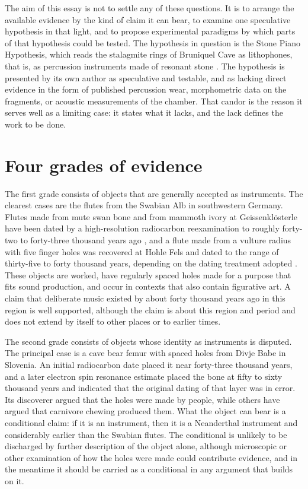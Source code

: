 \documentclass[12pt]{article}
\begin{document}
The aim of this essay is not to settle any of these questions. It is to arrange the available evidence by the kind of claim it can bear, to examine one speculative hypothesis in that light, and to propose experimental paradigms by which parts of that hypothesis could be tested. The hypothesis in question is the Stone Piano Hypothesis, which reads the stalagmite rings of Bruniquel Cave as lithophones, that is, as percussion instruments made of resonant stone \cite{stonepiano}. The hypothesis is presented by its own author as speculative and testable, and as lacking direct evidence in the form of published percussion wear, morphometric data on the fragments, or acoustic measurements of the chamber. That candor is the reason it serves well as a limiting case: it states what it lacks, and the lack defines the work to be done.

\section{Four grades of evidence}

The first grade consists of objects that are generally accepted as instruments. The clearest cases are the flutes from the Swabian Alb in southwestern Germany. Flutes made from mute swan bone and from mammoth ivory at Geissenkl\"osterle have been dated by a high-resolution radiocarbon reexamination to roughly forty-two to forty-three thousand years ago \cite{higham2012}, and a flute made from a vulture radius with five finger holes was recovered at Hohle Fels and dated to the range of thirty-five to forty thousand years, depending on the dating treatment adopted \cite{conard2009}. These objects are worked, have regularly spaced holes made for a purpose that fits sound production, and occur in contexts that also contain figurative art. A claim that deliberate music existed by about forty thousand years ago in this region is well supported, although the claim is about this region and period and does not extend by itself to other places or to earlier times.

The second grade consists of objects whose identity as instruments is disputed. The principal case is a cave bear femur with spaced holes from Divje Babe in Slovenia. An initial radiocarbon date placed it near forty-three thousand years, and a later electron spin resonance estimate placed the bone at fifty to sixty thousand years and indicated that the original dating of that layer was in error. Its discoverer argued that the holes were made by people, while others have argued that carnivore chewing produced them. What the object can bear is a conditional claim: if it is an instrument, then it is a Neanderthal instrument and considerably earlier than the Swabian flutes. The conditional is unlikely to be discharged by further description of the object alone, although microscopic or other examination of how the holes were made could contribute evidence, and in the meantime it should be carried as a conditional in any argument that builds on it.
\end{document}
